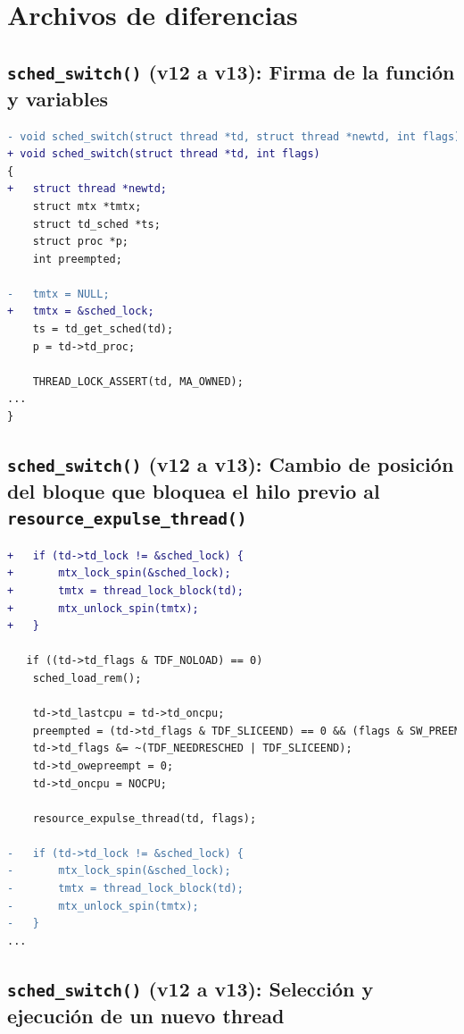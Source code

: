 \appendix

\chapter{Archivos de diferencias}\label{appendix:apA}

\section{\texttt{sched\_switch()} (v12 a v13): Firma de la función y variables}\label{appendix:apA1}

\begin{lstlisting}[language=diff]
- void sched_switch(struct thread *td, struct thread *newtd, int flags)
+ void sched_switch(struct thread *td, int flags)
{
+   struct thread *newtd;
    struct mtx *tmtx;
    struct td_sched *ts;
    struct proc *p;
    int preempted;

-   tmtx = NULL;
+   tmtx = &sched_lock;
    ts = td_get_sched(td);
    p = td->td_proc;

    THREAD_LOCK_ASSERT(td, MA_OWNED);
...
}
\end{lstlisting}



\section{\texttt{sched\_switch()} (v12 a v13): Cambio de posición del bloque que bloquea el hilo previo al \texttt{resource\_expulse\_thread()}}\label{appendix:apA2}

\begin{lstlisting}[language=diff]
+   if (td->td_lock != &sched_lock) {
+   	mtx_lock_spin(&sched_lock);
+   	tmtx = thread_lock_block(td);
+   	mtx_unlock_spin(tmtx);
+   }

   if ((td->td_flags & TDF_NOLOAD) == 0)
   	sched_load_rem();

    td->td_lastcpu = td->td_oncpu;
    preempted = (td->td_flags & TDF_SLICEEND) == 0 && (flags & SW_PREEMPT) != 0;
    td->td_flags &= ~(TDF_NEEDRESCHED | TDF_SLICEEND);
    td->td_owepreempt = 0;
    td->td_oncpu = NOCPU;

    resource_expulse_thread(td, flags);

-   if (td->td_lock != &sched_lock) {
-   	mtx_lock_spin(&sched_lock);
-   	tmtx = thread_lock_block(td);
-   	mtx_unlock_spin(tmtx);
-   }
...
\end{lstlisting}


\section{\texttt{sched\_switch()} (v12 a v13): Selección y ejecución de un nuevo thread}\label{appendix:apA3}

